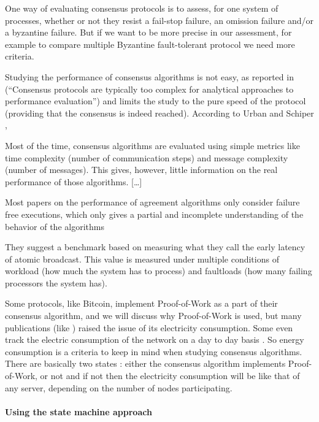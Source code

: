 \documentclass[11pt, twocolumn]{article}
\begin{document}
One way of evaluating consensus protocols is to assess, for one system of processes, whether or not they resist a fail-stop failure, an omission failure and/or a byzantine failure. But if we want to be more precise in our assessment, for example to compare multiple Byzantine fault-tolerant protocol we need more criteria.

Studying the performance of consensus algorithms is not easy, as reported in \cite{analysisperf} (“Consensus protocols are typically too complex for analytical approaches to performance evaluation”) and \cite{failureDetection} limits the study to the pure speed of the protocol (providing that the consensus is indeed reached). According to Urban and Schiper \cite{comparing},

\begin{displayquote}
    Most of the time, consensus algorithms are evaluated using
    simple metrics like time complexity (number of communication steps) and message complexity (number of messages). This gives, however, little information on the real
    performance of those algorithms. […]

    Most papers on the performance of agreement algorithms only consider failure free executions, which only gives a partial and incomplete
    understanding of the behavior of the algorithms
\end{displayquote}
They suggest a benchmark based on measuring what they call the early latency of atomic broadcast.  This value is measured under multiple conditions of workload (how much the system has to process) and faultloads (how many failing processors the system has).

Some protocols, like Bitcoin, implement Proof-of-Work as a part of their consensus algorithm, and we will discuss why Proof-of-Work is used, but many publications (like \cite{decarbonizing} ) raised the issue of its electricity consumption. Some even track the electric consumption of the network on a day to day basis \cite{cambridgeIndex}. So energy consumption is a criteria to keep in mind when studying consensus algorithms.
There are basically two states : either the consensus algorithm implements Proof-of-Work, or not and if not then the electricity consumption will be like that of any server, depending on the number of nodes participating.

\paragraph{Using the state machine approach}
\end{document}
